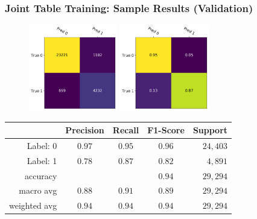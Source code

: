 \documentclass[usenames,dvipsnames]{beamer}
\begin{document}
\begin{frame}
  \frametitle{Joint Table Training: Sample Results (Validation)}
  \begin{figure}
    \centering
    \includegraphics[height=3.75cm, valign=c]{assets/joint_cm_table_test}
    \includegraphics[height=3.75cm, valign=c]{assets/joint_cm_table_norm_test}
  \end{figure}
  \begin{center}
    \begin{tabular}{rcccr}
    \toprule
    {} &  Precision &  Recall &  F1-Score & Support \\
    \midrule
    Label: 0 & $0.97$ & $0.95$ & $0.96$ & $24,403$ \\
    Label: 1 & $0.78$ & $0.87$ & $0.82$ & $4,891$ \\
    \midrule
    accuracy & {} & {} & $0.94$ & $29,294$ \\
    macro avg & $0.88$ & $0.91$ & $0.89$ & $29,294$ \\
    weighted avg & $0.94$ & $0.94$ & $0.94$ & $29,294$ \\
    \bottomrule
    \end{tabular}
  \end{center}
\end{frame}
\end{document}
